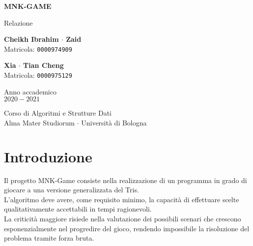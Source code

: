 \documentclass[11pt]{article}
\begin{document}
\begin{titlepage}
    \begin{center}
        \vspace*{1.5cm}
            
        \Huge
        \textbf{MNK-GAME}
            
        \vspace{0.5cm}
        \LARGE
        Relazione
            
        \vspace{1.5cm}
          
        \begin{minipage}[t]{0.47\textwidth}
        \begin{center}
        	{\large{\bf Cheikh Ibrahim $\cdot$ Zaid}}\\
			{\large Matricola: \texttt{0000974909}}
        \end{center}

		\end{minipage}
		\hfill
		\begin{minipage}[t]{0.47\textwidth}\raggedleft
		\begin{center}
        	{\large{\bf Xia $\cdot$ Tian Cheng}}\\
			{\large Matricola: \texttt{0000975129}}
        \end{center}
		\end{minipage}  
            
        \vspace{6cm}
            
        Anno accademico\\
        $2020 - 2021$
            
        \vspace{0.8cm}
            
            
        \Large
        Corso di Algoritmi e Strutture Dati\\
        Alma Mater Studiorum $\cdot$ Università di Bologna\\
            
    \end{center}
\end{titlepage}
\pagebreak


\section*{Introduzione}
\justify
Il progetto MNK-Game consiste nella realizzazione di un programma in grado di giocare a una versione generalizzata del Tris.\\
L'algoritmo deve avere, come requisito minimo, la capacità di effettuare scelte qualitativamente accettabili in tempi ragionevoli.\\
La criticità maggiore risiede nella valutazione dei possibili scenari che crescono esponenzialmente nel progredire del gioco, rendendo impossibile la risoluzione del problema tramite forza bruta.
\end{document}
